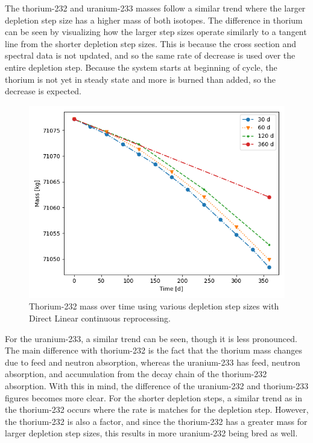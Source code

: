 The thorium-232 and uranium-233 masses follow a similar trend where the larger depletion step size has a higher mass of both isotopes. The difference in thorium can be seen by visualizing how the larger step sizes operate similarly to a tangent line from the shorter depletion step sizes. This is because the cross section and spectral data is not updated, and so the same rate of decrease is used over the entire depletion step. Because the system starts at beginning of cycle, the thorium is not yet in steady state and more is burned than added, so the decrease is expected.

\begin{figure}[H]
  \centering
  \includegraphics[scale=0.7]{images/DL_NSTEP_Th-232_mass-large.png}
  \caption{Thorium-232 mass over time using various depletion step sizes with Direct Linear continuous reprocessing.}
   \label{fig:DL-cont-th-2}
\end{figure}

For the uranium-233, a similar trend can be seen, though it is less pronounced. The main difference with thorium-232 is the fact that the thorium mass changes due to feed and neutron absorption, whereas the uranium-233 has feed, neutron absorption, and accumulation from the decay chain of the thorium-232 absorption. With this in mind, the difference of the uranium-232 and thorium-233 figures becomes more clear. For the shorter depletion steps, a similar trend as in the thorium-232 occurs where the rate is matches for the depletion step. However, the thorium-232 is also a factor, and since the thorium-232 has a greater mass for larger depletion step sizes, this results in more uranium-232 being bred as well.

